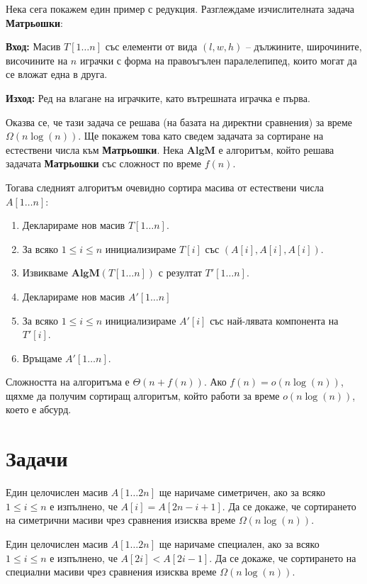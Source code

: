 Нека сега покажем един пример с редукция.
Разглеждаме изчислителната задача \textbf{Матрьошки}:

\textbf{Вход:} Масив $T[1 \dots n]$ със елементи от вида $(l, w, h)$ -- дължините, широчините, височините на $n$ играчки с форма на правоъгълен паралелепипед, които могат да се вложат една в друга.

\textbf{Изход:} Ред на влагане на играчките, като вътрешната играчка е първа.

Оказва се, че тази задача се решава (на базата на директни сравнения) за време $\Omega(n \log(n))$.
Ще покажем това като сведем задачата за сортиране на естествени числа към \textbf{Матрьошки}.
Нека $\mathbf{AlgM}$ е алгоритъм, който решава задачата \textbf{Матрьошки} със сложност по време $f(n)$.

\newpage

Тогава следният алгоритъм очевидно сортира масива от естествени числа $A[1 \dots n]$:
\begin{enumerate}
    \item Декларираме нов масив $T[1 \dots n]$.
    \item За всяко $1 \leq i \leq n$ инициализираме $T[i]$ със $(A[i], A[i], A[i])$.
    \item Извикваме $\mathbf{AlgM}(T[1 \dots n])$ с резултат $T'[1 \dots n]$.
    \item Декларираме нов масив $A'[1 \dots n]$
    \item За всяко $1 \leq i \leq n$ инициализираме $A'[i]$ със най-лявата компонента на $T'[i]$.
    \item Връщаме $A'[1 \dots n]$.
\end{enumerate}
Сложността на алгоритъма е $\Theta(n + f(n))$.
Ако $f(n) = o(n \log(n))$, щяхме да получим сортиращ алгоритъм, който работи за време $o(n \log(n))$, което е абсурд.

\section{Задачи}

\begin{problem}
Един целочислен масив $A[1 \dots 2n]$ ще наричаме симетричен, ако за всяко $1 \leq i \leq n$ е изпълнено, че $A[i] = A[2n - i + 1]$.
Да се докаже, че сортирането на симетрични масиви чрез сравнения изисква време $\Omega(n \log(n))$.
\end{problem}

\begin{problem}
Един целочислен масив $A[1 \dots 2n]$ ще наричаме специален, ако за всяко $1 \leq i \leq n$ е изпълнено, че $A[2i] < A[2i - 1]$.
Да се докаже, че сортирането на специални масиви чрез сравнения изисква време $\Omega(n \log(n))$.
\end{problem}

